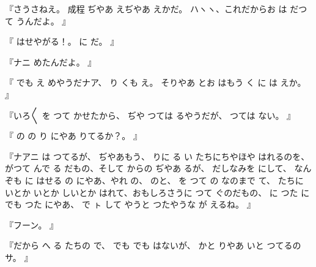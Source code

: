 『さうさねえ。
成程
ぢやあ
えぢやあ
えかだ。
ハヽヽ、これだからお
は
だつて
うんだよ。
』

『
はせやがる！。
に
だ。
』

『ナニ
めたんだよ。
』

『
でも
え
めやうだナア、
り
くも
え。
そりやあ
とお
はもう
く
に
は
えか。
』

『いろ〳〵
を
つて
かせたから、
ぢや
つては
るやうだが、
つては
ない。
』

『
の
の
り
にやあ
りてるか？。
』

『ナアニ
は
つてるが、
ぢやあもう、
りに
る
い
たちにちやほや
はれるのを、
がつて
んで
る
だもの、そして
からの
ぢやあ
るが、
だしなみを
にして、
なんぞも
に
はせる
の
にやあ、やれ
の、
のと、
を
つて
の
なのまで
て、
たちに
いとか
いとか
しいとか
はれて、おもしろさうに
つて
ぐのだもの、
に
つた
にでも
つた
にやあ、
で
ㇳ
して
やうと
つたやうな
が
えるね。
』

『フーン。
』

『だから
へ
る
たちの
で、
でも
でも
はないが、
かと
りやあ
いと
つてるのサ。
』

